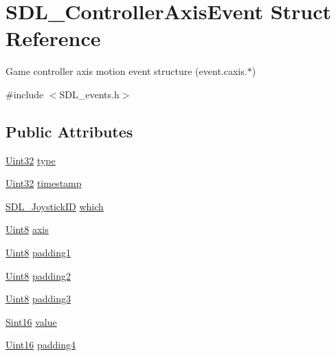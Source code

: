 \hypertarget{struct_s_d_l___controller_axis_event}{\section{S\-D\-L\-\_\-\-Controller\-Axis\-Event Struct Reference}
\label{struct_s_d_l___controller_axis_event}
}


Game controller axis motion event structure (event.\-caxis.$\ast$)  




{\ttfamily \#include $<$S\-D\-L\-\_\-events.\-h$>$}

\subsection*{Public Attributes}
\begin{DoxyCompactItemize}
\item 
\hyperlink{_s_d_l__stdinc_8h_add440eff171ea5f55cb00c4a9ab8672d}{Uint32} \hyperlink{struct_s_d_l___controller_axis_event_aa904b61e4763d28d887cf8afcc3cbb7c}{type}
\item 
\hyperlink{_s_d_l__stdinc_8h_add440eff171ea5f55cb00c4a9ab8672d}{Uint32} \hyperlink{struct_s_d_l___controller_axis_event_afc92dba0b4d1652a1ecf9e85606d1f14}{timestamp}
\item 
\hyperlink{_s_d_l__joystick_8h_a3c3d32500cb08f76ee8077983912c0bd}{S\-D\-L\-\_\-\-Joystick\-I\-D} \hyperlink{struct_s_d_l___controller_axis_event_a07087f68ea9d64b50047d65312ee7b94}{which}
\item 
\hyperlink{_s_d_l__stdinc_8h_a2944638813a090aa23e62f4da842c3e2}{Uint8} \hyperlink{struct_s_d_l___controller_axis_event_aba6543c143521aebce06a41a8cf79db0}{axis}
\item 
\hyperlink{_s_d_l__stdinc_8h_a2944638813a090aa23e62f4da842c3e2}{Uint8} \hyperlink{struct_s_d_l___controller_axis_event_af980495b1e24f9a868f2ccb25ce9629b}{padding1}
\item 
\hyperlink{_s_d_l__stdinc_8h_a2944638813a090aa23e62f4da842c3e2}{Uint8} \hyperlink{struct_s_d_l___controller_axis_event_a4a04fcd20a54db21c5258ab0e40c6ab5}{padding2}
\item 
\hyperlink{_s_d_l__stdinc_8h_a2944638813a090aa23e62f4da842c3e2}{Uint8} \hyperlink{struct_s_d_l___controller_axis_event_ab82598fe5621dca9b1a41f7b2ca1e9a0}{padding3}
\item 
\hyperlink{_s_d_l__stdinc_8h_a9d0257032c0e146ab6121bf0122712f5}{Sint16} \hyperlink{struct_s_d_l___controller_axis_event_a1ed7f14255ed01b982d40a38791d475a}{value}
\item 
\hyperlink{_s_d_l__stdinc_8h_a31fcc0a076c9068668173ee26d33e42b}{Uint16} \hyperlink{struct_s_d_l___controller_axis_event_ae0ad0f279b9978bbbac9f5b22ae8020b}{padding4}
\end{DoxyCompactItemize}


